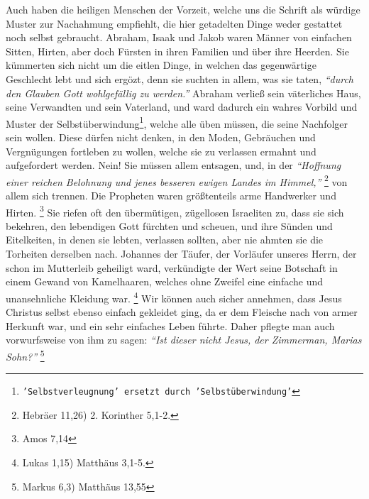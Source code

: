 Auch haben die heiligen Menschen der Vorzeit, welche uns die Schrift als würdige
Muster zur Nachahmung empfiehlt, die hier getadelten Dinge weder gestattet noch
selbst gebraucht. Abraham, Isaak und 
Jakob waren Männer von einfachen Sitten,
Hirten, aber doch Fürsten in ihren Familien und über ihre Heerden. Sie
kümmerten sich nicht um die eitlen Dinge, in welchen das gegenwärtige
Geschlecht lebt und sich ergözt, denn sie suchten in allem, was sie taten,
\textit{"`durch den Glauben Gott wohlgefällig zu werden."'} Abraham verließ sein
väterliches Haus, seine Verwandten und sein Vaterland, und ward dadurch ein
wahres Vorbild und Muster der Selbstüberwindung\footnote{\texttt{'Selbstverleugnung' 
ersetzt durch 'Selbstüberwindung'}}, welche alle üben müssen, die
seine Nachfolger sein wollen. Diese dürfen nicht denken, in den Moden,
Gebräuchen und Vergnügungen fortleben zu wollen, welche sie zu verlassen
ermahnt und aufgefordert werden. Nein! Sie müssen allem entsagen, und, in der
\textit{"`Hoffnung einer reichen Belohnung und jenes besseren ewigen Landes im
Himmel,"'}
\footnote{Hebräer 11,26) 2. Korinther 5,1-2.}
von allem sich trennen. Die
Propheten waren größtenteils arme Handwerker und Hirten.
\footnote{Amos 7,14}
Sie riefen oft den übermütigen, zügellosen Israeliten zu, dass sie 
sich bekehren,
den lebendigen Gott fürchten und scheuen, und ihre
Sünden und Eitelkeiten, in
denen sie lebten, verlassen sollten, aber nie ahmten sie die Torheiten
derselben nach. Johannes der Täufer, der Vorläufer unseres 
Herrn, der schon im
Mutterleib geheiligt ward, verkündigte der Wert seine Botschaft in einem
Gewand von Kamelhaaren, welches ohne Zweifel eine einfache und unansehnliche
Kleidung war.
\footnote{Lukas 1,15) Matthäus 3,1-5.}
Wir können auch sicher annehmen,
dass Jesus Christus selbst ebenso einfach gekleidet ging, da er dem Fleische
nach von armer Herkunft war, und ein sehr einfaches Leben 
führte. Daher pflegte
man auch vorwurfsweise von ihm zu sagen:
\textit{"`Ist dieser nicht Jesus, der
Zimmerman, Marias Sohn?"'}
\footnote{Markus 6,3) Matthäus 13,55}
